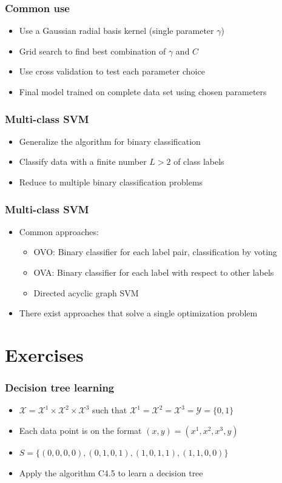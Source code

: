 \documentclass[10pt]{beamer}
\begin{document}
\begin{frame}
  \frametitle{Common use}
  \begin{itemize}
    \item Use a Gaussian radial basis kernel (single parameter $\gamma$)
	\item {\color{red} Grid search} to find best combination of $\gamma$ and $C$
	\item Use {\color{blue} cross validation} to test each parameter choice
	\item Final model trained on {\color{green} complete} data set using chosen parameters
  \end{itemize}
\end{frame}

\begin{frame}
  \frametitle{Multi-class SVM}
  \begin{itemize}
    \item Generalize the algorithm for binary classification
	\item Classify data with a finite number $L>2$ of class labels
	\item Reduce to multiple binary classification problems
  \end{itemize}
\end{frame}

\begin{frame}
  \frametitle{Multi-class SVM}
  \begin{itemize}
    \item Common approaches:
  \begin{itemize}
    \item OVO: Binary classifier for each label pair, classification by {\color{red} voting}
	\item OVA: Binary classifier for each label with respect to other labels
	\item Directed acyclic graph SVM
  \end{itemize}
	\item There exist approaches that solve a single optimization problem
  \end{itemize}
\end{frame}

\section{Exercises}

\begin{frame}
  \frametitle{Decision tree learning}
  \begin{itemize}
	\item $\mathcal{X} = \mathcal{X}^1 \times \mathcal{X}^2 \times \mathcal{X}^3$ such that $\mathcal{X}^1 = \mathcal{X}^2 = \mathcal{X}^3 = \mathcal{Y} = \{0,1\}$
	\item Each data point is on the format $(x,y) = (x^1,x^2,x^3,y)$
    \item {\color{red} $S=\{(0,0,0,0),(0,1,0,1),(1,0,1,1),(1,1,0,0)\}$}
	\item Apply the algorithm C4.5 to learn a decision tree
  \end{itemize}
\end{frame}
\end{document}

